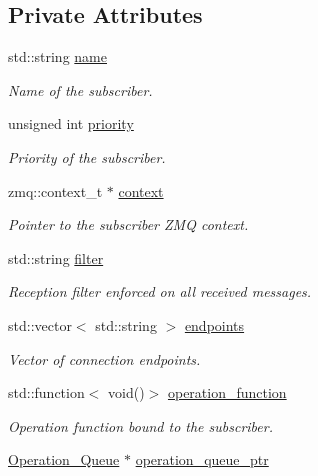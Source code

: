 \subsection*{Private Attributes}
\begin{DoxyCompactItemize}
\item 
std\-::string \hyperlink{classzcm_1_1Subscriber_a2ec3b22204d0f3f72e996b19b086910b}{name}
\begin{DoxyCompactList}\small\item\em Name of the subscriber. \end{DoxyCompactList}\item 
unsigned int \hyperlink{classzcm_1_1Subscriber_a208baedba808c9229887ab8af00725fd}{priority}
\begin{DoxyCompactList}\small\item\em Priority of the subscriber. \end{DoxyCompactList}\item 
zmq\-::context\-\_\-t $\ast$ \hyperlink{classzcm_1_1Subscriber_a271ab3c945d1d3a84551bdca5e50f83f}{context}
\begin{DoxyCompactList}\small\item\em Pointer to the subscriber Z\-M\-Q context. \end{DoxyCompactList}\item 
std\-::string \hyperlink{classzcm_1_1Subscriber_a28ab0921d97bc4d05ac6bb64c977cc35}{filter}
\begin{DoxyCompactList}\small\item\em Reception filter enforced on all received messages. \end{DoxyCompactList}\item 
std\-::vector$<$ std\-::string $>$ \hyperlink{classzcm_1_1Subscriber_a81590d7017038d6f50073baaa485a1b7}{endpoints}
\begin{DoxyCompactList}\small\item\em Vector of connection endpoints. \end{DoxyCompactList}\item 
std\-::function$<$ void()$>$ \hyperlink{classzcm_1_1Subscriber_ab8e52c24d7dc57b33d2c1536de4197b2}{operation\-\_\-function}
\begin{DoxyCompactList}\small\item\em Operation function bound to the subscriber. \end{DoxyCompactList}\item 
\hyperlink{classzcm_1_1Operation__Queue}{Operation\-\_\-\-Queue} $\ast$ \hyperlink{classzcm_1_1Subscriber_a1cd579aa570832f9656b9fa24747dde3}{operation\-\_\-queue\-\_\-ptr}

\end{DoxyCompactItemize}
